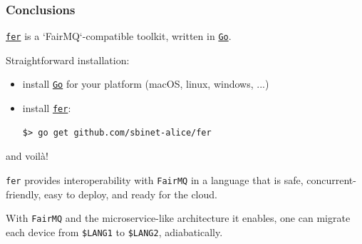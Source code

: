 \documentclass[9pt]{beamer}
\newcommand{\myblue} [1] {{\color{blue}#1}}
\begin{document}
\begin{frame}[fragile]
\frametitle{Conclusions}


\myblue{\href{https://github.com/sbinet-alice/fer}{\texttt{fer}}} is a `FairMQ`-compatible toolkit, written in \myblue{\href{https://golang.org}{\texttt{Go}}}.


Straightforward installation:


\begin{itemize}
\item install \myblue{\href{https://golang.org/doc/install}{\texttt{Go}}} for your platform (macOS, linux, windows, ...)
\item install \myblue{\href{https://github.com/sbinet-alice/fer}{\texttt{fer}}}:
\begin{verbatim}
$> go get github.com/sbinet-alice/fer

\end{verbatim}

\end{itemize}



and voil\`a!

	\begin{exampleblock}{}
\texttt{fer} provides interoperability with \texttt{FairMQ} in a language that is safe, concurrent-friendly, easy to deploy, and ready for the cloud.

\quad

With \texttt{FairMQ} and the microservice-like architecture it enables, one can migrate each device from \texttt{\$LANG1} to \texttt{\$LANG2}, adiabatically.
	\end{exampleblock}


\end{frame}
\end{document}
